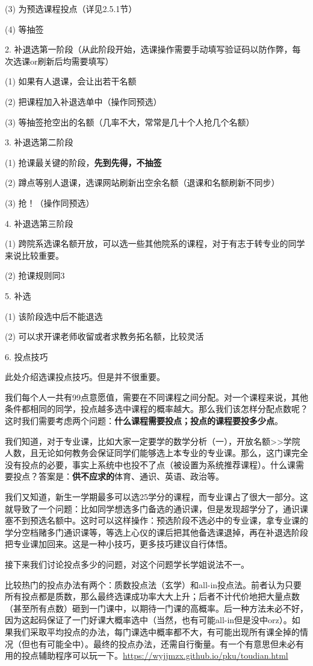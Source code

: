 \documentclass[11pt,oneside]{book}
\begin{document}
(3) 为预选课程投点（详见2.5.1节）

(4) 等抽签

2. 补退选第一阶段（从此阶段开始，选课操作需要手动填写验证码以防作弊，每次选课or刷新后均需要填写）

(1) 如果有人退课，会让出若干名额

(2) 把课程加入补退选单中（操作同预选）

(3) 等抽签抢空出的名额（几率不大，常常是几十个人抢几个名额）

3. 补退选第二阶段

(1) 抢课最关键的阶段，\textbf{\textbf{先到先得，不抽签}}

(2) 蹲点等别人退课，选课网站刷新出空余名额（退课和名额刷新不同步）

(3) 抢！（操作同预选）

4. 补退选第三阶段

(1) 跨院系选课名额开放，可以选一些其他院系的课程，对于有志于转专业的同学来说比较重要。

(2) 抢课规则同3

5. 补选

(1) 该阶段选中后不能退选

(2) 可以求开课老师收留或者求教务拓名额，比较灵活

6. 投点技巧

此处介绍选课投点技巧。但是并不很重要。

我们每个人一共有99点意愿值，需要在不同课程之间分配。对一个课程来说，其他条件都相同的同学，投点越多选中课程的概率越大。那么我们该怎样分配点数呢？这时我们需要考虑两个问题：\textbf{\textbf{什么课程需要投点；投点的课程要投多少点}}。

我们知道，对于专业课，比如大家一定要学的数学分析（一），开放名额>>学院人数，且无论如何教务会保证同学们能够选上本专业的专业课。那么，这门课完全没有投点的必要，事实上系统中也投不了点（被设置为系统推荐课程）。什么课需要投点？答案是：\textbf{\textbf{供不应求的}}体育、通识、英语、政治等。

我们又知道，新生一学期最多可以选25学分的课程，而专业课占了很大一部分。这就导致了一个问题：比如同学想选多门备选的通识课，但是发现超学分了，通识课塞不到预选名额中。这时可以这样操作：预选阶段不选必中的专业课，拿专业课的学分空档赌多门通识课等，等选上心仪的课后把其他备选课退掉，再在补退选阶段把专业课加回来。这是一种小技巧，更多技巧建议自行体悟。

接下来我们讨论投点多少的问题，对这个问题学长学姐说法不一。

比较热门的投点办法有两个：质数投点法（玄学）和all-in投点法。前者认为只要所有投点都是质数，那么最终选课成功率大大上升；后者不计代价地把大量点数（甚至所有点数）砸到一门课中，以期待一门课的高概率。后一种方法未必不好，因为这起码保证了一门好课大概率选中（当然，也有可能all-in但是没中orz）。如果我们采取平均投点的办法，每门课选中概率都不大，有可能出现所有课全掉的情况（但也有可能全中）。最终的投点办法，还需自行衡量。有一个有意思但未必有用的投点辅助程序可以玩一下。\href{https://wyjjmzx.github.io/pku/toudian.html}{https://wyjjmzx.github.io/pku/toudian.html}
\end{document}
